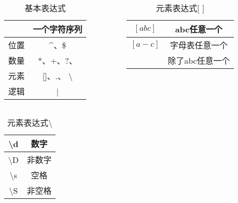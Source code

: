 \documentclass{beamer}
\begin{document}
\begin{frame}[t]
	\begin{columns}

		\begin{column}{0.5\textwidth}
			\begin{table}[htpb]
				\centering
				\caption{基本表达式}
				\label{tab:label}
				\begin{tabular}{|c|c|}
					\hline
					\[\] & 一个字符序列                 \\
					\hline
					位置   & $\^$、\$                \\
					\hline
					数量   & *、+、?、{}               \\
					\hline
					元素   & []、$.$、 \textbackslash \\
					\hline
					逻辑   & |                      \\
					\hline
				\end{tabular}
			\end{table}
		\end{column}
		\pause
		\begin{column}{0.5\textwidth}
			\begin{table}[htpb]
				\centering
				\caption{元素表达式[   ]}
				\label{tab:label}

				\begin{tabular}{|c|c|}
					\hline
					$[abc]$    & abc任意一个   \\
					\hline
					$[a-c]$    & 字母表任意一个   \\
					\hline
					[ $\^$abc] & 除了abc任意一个 \\
					\hline
				\end{tabular}
			\end{table}

		\end{column}

	\end{columns}
	\pause
	\begin{table}[htpb]
		\centering
		\caption{元素表达式\textbackslash}
		\label{tab:label}

		\begin{tabular}{|c|c|}
			\hline
			\textbackslash d & 数字\\
			\hline
			\textbackslash D & 非数字\\
			\hline
			\textbackslash s & 空格\\
			\hline
			\textbackslash S & 非空格\\
			\hline
		\end{tabular}
	\end{table}
\end{frame}
\end{document}
